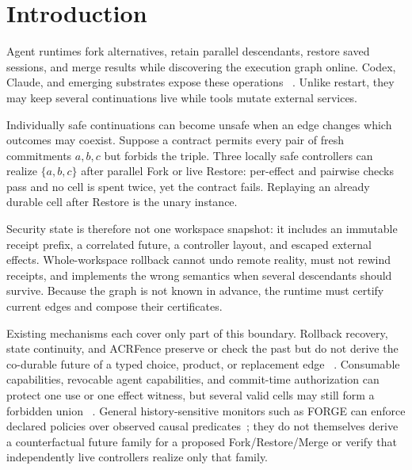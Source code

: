 \section{Introduction}
\label{sec:introduction}

Agent runtimes fork alternatives, retain parallel descendants, restore saved
sessions, and merge results while discovering the execution graph online.
Codex, Claude, and emerging substrates expose these operations
~\cite{codexappserver,claudesessions,wang2026fork,wu2026crab}.  Unlike restart,
they may keep several continuations live while tools mutate external services.

Individually safe continuations can become unsafe when an edge changes which
outcomes may coexist.  Suppose a contract permits every pair of fresh
commitments $a,b,c$ but forbids the triple.  Three locally safe controllers can
realize $\{a,b,c\}$ after parallel Fork or live Restore: per-effect and pairwise
checks pass and no cell is spent twice, yet the contract fails.  Replaying an
already durable cell after Restore is the unary instance.

Security state is therefore not one workspace snapshot: it includes an
immutable receipt prefix, a correlated future, a controller layout, and escaped
external effects.  Whole-workspace rollback cannot undo remote reality, must
not rewind receipts, and implements the wrong semantics when several
descendants should survive.  Because the graph is not known in advance, the
runtime must certify current edges and compose their certificates.

Existing mechanisms each cover only part of this boundary.  Rollback recovery,
state continuity, and ACRFence preserve or check the past but do not derive the
co-durable future of a typed choice, product, or replacement edge
~\cite{elnozahy2002rollback,parno2011memoir,zheng2026acrfence}.
Consumable capabilities, revocable agent capabilities, and commit-time
authorization can protect one use or one effect witness, but several valid
cells may still form a forbidden union
~\cite{bowers2007consumable,santos2026lingering,santos2026committime}.
General history-sensitive monitors such as FORGE can enforce declared policies
over observed causal predicates~\cite{palumbo2026forge}; they do not themselves
derive a counterfactual future family for a proposed Fork/Restore/Merge or
verify that independently live controllers realize only that family.

